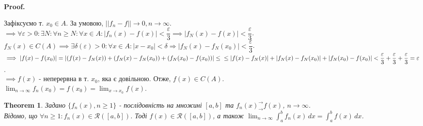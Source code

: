 \documentclass[a4paper, 10pt]{article}
\makeatletter
\def\huge{\displaystyle}
\def\qed{$\blacksquare$}
\theoremstyle{theoremdd}
\newtheorem{theorem}{Theorem}[subsection]
\theoremstyle{theoremdd}
\theoremstyle{theoremdd}
\theoremstyle{theoremdd}
\theoremstyle{theoremdd}
\theoremstyle{theoremdd}
\theoremstyle{theoremdd}
\theoremstyle{theoremdd}
\renewenvironment{proof}[1][Proof.\\]{\par
\pushQED{\hfill \qed}%
\normalfont \topsep6\p@\@plus6\p@\relax
\trivlist
\item\relax
{\bfseries
#1\@addpunct{.}}\hspace\labelsep\ignorespaces
}{%
\popQED\endtrivlist\@endpefalse
}
\makeatother
\begin{document}
\begin{proof}
Зафіксуємо т. $x_0 \in A$. За умовою, $||f_n-f|| \to 0, n \to \infty$.\\
$\implies \forall \varepsilon > 0: \exists N: \forall n \geq N: \forall x \in A: |f_n(x)-f(x)| < \dfrac{\varepsilon}{3} \implies |f_N(x) - f(x)| < \dfrac{\varepsilon}{3}$.\\
$f_N(x) \in C(A) \implies \exists \delta(\varepsilon) > 0: \forall x \in A: |x - x_0| < \delta \Rightarrow |f_N(x) - f_N(x_0)| < \dfrac{\varepsilon}{3}$.\\
$\implies |f(x) - f(x_0)| = |(f(x)-f_N(x)) + (f_N(x)-f_N(x_0)) + (f_N(x_0)-f(x_0))| \leq \\ \leq |f(x)-f_N(x)| + |f_N(x) - f_N(x_0)| + |f_N(x_0) - f(x_0)| < \dfrac{\varepsilon}{3} + \dfrac{\varepsilon}{3} + \dfrac{\varepsilon}{3} = \varepsilon$.\\
$\implies f(x)$ - неперервна в т. $x_0$, яка є довільною. Отже, $f(x) \in C(A)$.\\
$\huge\lim_{n \to \infty} f_n(x_0) = f(x_0) = \lim_{x \to x_0} f(x)$.
\end{proof}

\begin{theorem}
Задано $\{f_n(x), n \geq 1\}$ - послідовність на множині $[a,b]$ та $f_n(x)^\rightarrow_\rightarrow f(x)$, $n \to \infty$.\\
Відомо, що $\forall n \geq 1: f_n(x) \in \mathcal{R}([a,b])$. Тоді $f(x) \in \mathcal{R}([a,b])$, а також $\huge\lim_{n \to \infty} \int_a^b f_n(x)\,dx = \int_a^b f(x)\,dx$.
\end{theorem}
\end{document}
